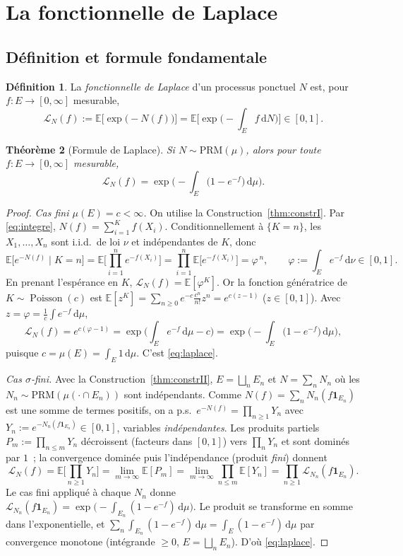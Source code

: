 \documentclass[11pt,a4paper]{article}
\theoremstyle{plain}
\newtheorem{theoreme}{Théorème}[section]
\theoremstyle{definition}
\newtheorem{definition}[theoreme]{Définition}
\newcommand{\E}{\mathbb{E}}
\newcommand{\Poi}{\operatorname{Poisson}}
\newcommand{\one}{\mathbf{1}}
\newcommand{\dd}{\,\mathrm{d}}
\newcommand{\calL}{\mathcal{L}}
\begin{document}
\section{La fonctionnelle de Laplace}\label{sec:laplace}

\subsection{Définition et formule fondamentale}

\begin{definition}
La \emph{fonctionnelle de Laplace} d'un processus ponctuel $N$ est, pour $f:E\to[0,\infty]$ mesurable,
\[
\calL_N(f) := \E\Big[\exp\big(-N(f)\big)\Big]
= \E\Big[\exp\Big(-\int_E f\dd N\Big)\Big]\in[0,1].
\]
\end{definition}

\begin{theoreme}[Formule de Laplace]\label{thm:laplace}
Si $N\sim\mathrm{PRM}(\mu)$, alors pour toute $f:E\to[0,\infty]$ mesurable,
\begin{equation}\label{eq:laplace}
\boxed{\;\calL_N(f)=\exp\!\Big(-\int_E\big(1-e^{-f}\big)\dd\mu\Big).\;}
\end{equation}
\end{theoreme}

\begin{proof}
\emph{Cas fini $\mu(E)=c<\infty$.} On utilise la Construction~\ref{thm:constrI}. Par \eqref{eq:integre}, $N(f)=\sum_{i=1}^{K}f(X_i)$. Conditionnellement à $\{K=n\}$, les $X_1,\dots,X_n$ sont i.i.d.\ de loi $\nu$ et indépendantes de $K$, donc
\[
\E\big[e^{-N(f)}\mid K=n\big]=\E\Big[\prod_{i=1}^n e^{-f(X_i)}\Big]=\prod_{i=1}^n\E\big[e^{-f(X_i)}\big]=\varphi^{\,n},
\qquad
\varphi := \int_E e^{-f}\dd\nu\in[0,1].
\]
En prenant l'espérance en $K$, $\calL_N(f)=\E[\varphi^{K}]$. Or la fonction génératrice de $K\sim\Poi(c)$ est $\E[z^{K}]=\sum_{n\ge0}e^{-c}\frac{c^n}{n!}z^n=e^{c(z-1)}$ ($z\in[0,1]$). Avec $z=\varphi=\frac1c\int e^{-f}\dd\mu$,
\[
\calL_N(f)=e^{c(\varphi-1)}
=\exp\Big(\int_E e^{-f}\dd\mu-c\Big)
=\exp\Big(-\int_E\big(1-e^{-f}\big)\dd\mu\Big),
\]
puisque $c=\mu(E)=\int_E 1\dd\mu$. C'est \eqref{eq:laplace}.

\emph{Cas $\sigma$-fini.} Avec la Construction~\ref{thm:constrII}, $E=\bigsqcup_n E_n$ et $N=\sum_n N_n$ où les $N_n\sim\mathrm{PRM}(\mu(\cdot\cap E_n))$ sont indépendants. Comme $N(f)=\sum_n N_n(f\one_{E_n})$ est une somme de termes positifs, on a p.s.\ $e^{-N(f)}=\prod_{n\ge1}Y_n$ avec $Y_n:=e^{-N_n(f\one_{E_n})}\in[0,1]$, variables \emph{indépendantes}. Les produits partiels $P_m:=\prod_{n\le m}Y_n$ décroissent (facteurs dans $[0,1]$) vers $\prod_n Y_n$ et sont dominés par $1$~; la convergence dominée puis l'indépendance (produit \emph{fini}) donnent
\[
\calL_N(f)=\E\Big[\prod_{n\ge1} Y_n\Big]
=\lim_{m\to\infty}\E[P_m]
=\lim_{m\to\infty}\prod_{n\le m}\E[Y_n]
=\prod_{n\ge1}\calL_{N_n}(f\one_{E_n}).
\]
Le cas fini appliqué à chaque $N_n$ donne $\calL_{N_n}(f\one_{E_n})=\exp\big(-\int_{E_n}(1-e^{-f})\dd\mu\big)$. Le produit se transforme en somme dans l'exponentielle, et $\sum_n\int_{E_n}(1-e^{-f})\dd\mu=\int_E(1-e^{-f})\dd\mu$ par convergence monotone (intégrande $\ge0$, $E=\bigsqcup_n E_n$). D'où \eqref{eq:laplace}.
\end{proof}
\end{document}
